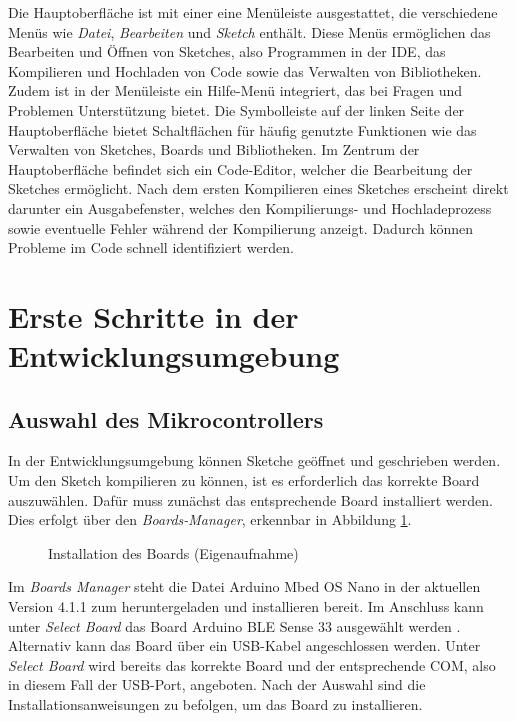 Die Hauptoberfläche ist mit einer eine Menüleiste ausgestattet, die verschiedene Menüs wie \textit{Datei}, \textit{Bearbeiten} und \textit{Sketch} enthält. Diese Menüs ermöglichen das Bearbeiten und Öffnen von Sketches, also Programmen in der IDE, das Kompilieren und Hochladen von Code sowie das Verwalten von Bibliotheken. Zudem ist in der Menüleiste ein Hilfe-Menü integriert, das bei Fragen und Problemen Unterstützung bietet. 
Die Symbolleiste auf der linken Seite der Hauptoberfläche bietet Schaltflächen für häufig genutzte Funktionen wie das Verwalten von Sketches, Boards und Bibliotheken.
Im Zentrum der Hauptoberfläche befindet sich ein Code-Editor, welcher die Bearbeitung der Sketches ermöglicht. Nach dem ersten Kompilieren eines Sketches erscheint direkt darunter ein Ausgabefenster, welches den Kompilierungs- und Hochladeprozess sowie eventuelle Fehler während der Kompilierung anzeigt. Dadurch können Probleme im Code schnell identifiziert werden.

\section{Erste Schritte in der Entwicklungsumgebung}

\subsection{Auswahl des Mikrocontrollers}

In der Entwicklungsumgebung können  Sketche geöffnet und geschrieben werden. Um den Sketch kompilieren zu können, ist es erforderlich das korrekte Board auszuwählen.
Dafür muss zunächst das entsprechende Board installiert werden. 
Dies erfolgt über den \textit{Boards-Manager}, erkennbar in Abbildung \ref{Boardsmanager}.
 
\begin{figure}[H]
	\begin{center}
		\caption{Installation des Boards (Eigenaufnahme)} \label{Boardsmanager}
	\end{center}
\end{figure}

Im \textit{Boards Manager} steht die Datei Arduino Mbed OS Nano in der aktuellen Version 4.1.1 zum heruntergeladen und installieren bereit. Im Anschluss kann unter \textit{Select Board} das Board Arduino BLE Sense 33 ausgewählt werden \cite{ArdIDE.2024b}.
Alternativ kann das Board über ein USB-Kabel angeschlossen werden. Unter\textit{ Select Board} wird bereits das korrekte Board und der entsprechende COM, also in diesem Fall der USB-Port, angeboten. Nach der Auswahl sind die Installationsanweisungen zu befolgen, um das Board zu installieren.

